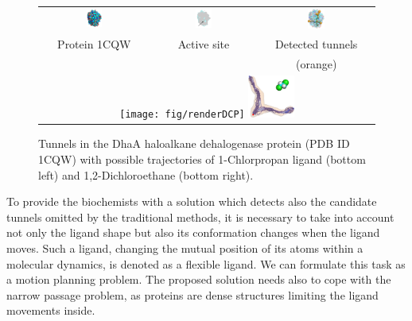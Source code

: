 \documentclass[usletter, 10pt, conference]{ieeeconf} %
\begin{document}
\begin{figure}[t]
\centering
{\footnotesize
\renewcommand{\arraystretch}{-0.5}
\renewcommand{\tabcolsep}{-1pt}
\begin{tabular}{ccc}
\includegraphics[width=0.15\textwidth]{fig/motiv1} &
\includegraphics[width=0.17\textwidth]{fig/motiv2lab} &
\includegraphics[width=0.16\textwidth]{fig/motiv3}  \\
Protein 1CQW & Active site & Detected tunnels \\ %
             &            & (orange)         \\  %
\multicolumn{3}{c}{%
\texttt{[image: fig/renderDCP]}  \hskip 15pt
\includegraphics[width=0.14\textwidth]{fig/render37t}} \\ 
\end{tabular}
}
\caption{\label{fig::motiv}
    Tunnels in the DhaA haloalkane dehalogenase protein (PDB ID 1CQW) with possible trajectories of 1-Chlorpropan ligand (bottom left) and 1,2-Dichloroethane (bottom right).
}
\end{figure}

To provide the biochemists with a solution which detects also the candidate tunnels omitted by the traditional methods, it is necessary to take into account not only the ligand shape but also its conformation changes when the ligand moves.
Such a ligand, changing the mutual position of its atoms within a molecular dynamics, is denoted as a flexible ligand.
We can formulate this task as a motion planning problem.
The proposed solution needs also to cope with the narrow passage problem, as proteins are dense structures limiting the ligand movements inside.
\end{document}
